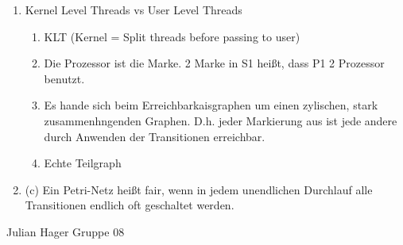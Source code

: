 \begin{enumerate}[label={T\arabic*},start=38]
	\item Kernel Level Threads vs User Level Threads
		\begin{enumerate}
			\item KLT (Kernel = Split threads before passing to user)
			\item Die Prozessor ist die Marke. 2 Marke in S1 heißt, dass P1 2 Prozessor benutzt. 
			\item Es hande sich beim Erreichbarkaisgraphen um einen zylischen, stark zusammenhngenden Graphen. D.h. jeder Markierung aus ist jede andere durch Anwenden der Transitionen erreichbar.
			\item Echte Teilgraph
		\end{enumerate}
	\item (c) Ein Petri-Netz heißt fair, wenn in jedem unendlichen Durchlauf alle Transitionen endlich oft geschaltet werden.
\end{enumerate}

Julian Hager
Gruppe 08